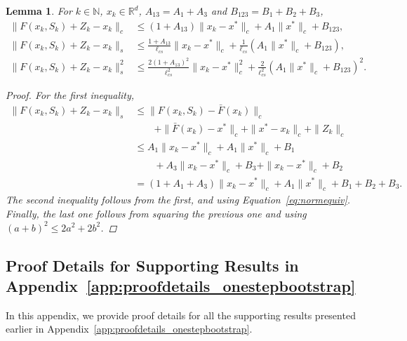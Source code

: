 \documentclass{article}
\newcommand{\lrp}[1]{\left( #1 \right)}
\newcommand{\R}{\mathbb{R}}
\newcommand{\N}{\mathbb{N}}
\newcommand{\lcs}{\ell_{cs}}
\newcommand{\xk}{x_k}
\newtheorem{lemma}[theorem]{Lemma}
\begin{document}
\begin{lemma}\label{lem:noiseterms}
    For $k\in\N$, $\xk \in \R^d$, $A_{13} = A_1 + A_3$ and $B_{123} = B_1 + B_2 + B_3$, 
    \begin{align*} 
        \|F(\xk, S_k) + Z_k  - \xk\|_c &\le \lrp{1 + A_{13}}\|\xk - x^*\|_c + A_1 \|x^*\|_c  + B_{123},\\
        \|F(\xk, S_k) + Z_k  - \xk\|_s &\le \frac{1+ A_{13}}{\lcs} \|\xk - x^*\|_c + \frac{1}{\lcs} \lrp{A_{1} \|x^*\|_c  + B_{123}}, \\
        \|F(\xk, S_k) + Z_k - \xk\|^2_s 
        &\le \frac{2(1+A_{13})^2}{\lcs^2} \|\xk - x^*\|^2_c + \frac{2}{\lcs^2} \lrp{A_{1} \|x^*\|_c  + B_{123}}^2. 
    \end{align*}
    \begin{proof} For the first inequality, 
        \begin{align*}
            \|F(\xk, S_k) + Z_k - \xk\|_s
            &\le  \|F(\xk, S_k) - \bar{F}(\xk) \|_c  \\
            &\qquad + \|\bar{F}(\xk) - x^*\|_c + \|x^* - \xk\|_c + \|Z_k\|_c  \tag{Triangle ineq.}\\
            &\le A_1 \|\xk - x^*\|_c + A_1\|x^*\|_c + B_1 \\
            &\qquad + A_3 \|\xk - x^*\|_c + B_3 + \|\xk -x^*\|_c + B_2 \\
            &= \lrp{1 + A_1 + A_3} \|\xk - x^*\|_c + {A_1} \|x^*\|_c + B_1 + B_2 + B_3.
        \end{align*}
        The second inequality follows from the first, and using Equation~\eqref{eq:normequiv}. Finally, the last one follows from squaring the previous one and using $(a+b)^2 \le 2 a^2 + 2 b^2$.
    \end{proof}

    
\end{lemma}

\subsection{Proof Details for Supporting Results in Appendix~\ref{app:proofdetails_onestepbootstrap}}
In this appendix, we provide proof details for all the supporting results presented earlier in Appendix~\ref{app:proofdetails_onestepbootstrap}. 
\end{document}

